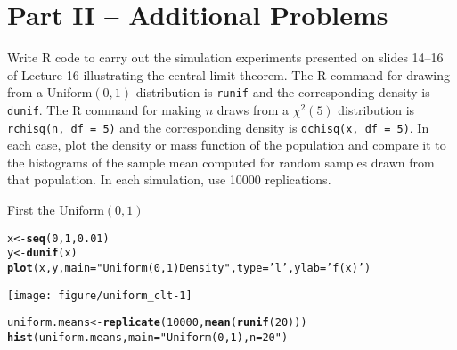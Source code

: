 \documentclass[addpoints,12pt]{exam}\usepackage[]{graphicx}\usepackage[]{color}
\makeatletter
\def\maxwidth{ %
  \ifdim\Gin@nat@width>\linewidth
    \linewidth
  \else
    \Gin@nat@width
  \fi
}
\newcommand{\hlnum}[1]{\textcolor[rgb]{0.686,0.059,0.569}{#1}}%
\newcommand{\hlstr}[1]{\textcolor[rgb]{0.192,0.494,0.8}{#1}}%
\newcommand{\hlstd}[1]{\textcolor[rgb]{0.345,0.345,0.345}{#1}}%
\newcommand{\hlkwb}[1]{\textcolor[rgb]{0.69,0.353,0.396}{#1}}%
\newcommand{\hlkwc}[1]{\textcolor[rgb]{0.333,0.667,0.333}{#1}}%
\newcommand{\hlkwd}[1]{\textcolor[rgb]{0.737,0.353,0.396}{\textbf{#1}}}%
\newenvironment{kframe}{%
 \def\at@end@of@kframe{}%
 \ifinner\ifhmode%
  \def\at@end@of@kframe{\end{minipage}}%
  \begin{minipage}{\columnwidth}%
 \fi\fi%
 \def\FrameCommand##1{\hskip\@totalleftmargin \hskip-\fboxsep
 \colorbox{shadecolor}{##1}\hskip-\fboxsep
     \hskip-\linewidth \hskip-\@totalleftmargin \hskip\columnwidth}%
 \MakeFramed {\advance\hsize-\width
   \@totalleftmargin\z@ \linewidth\hsize
   \@setminipage}}%
 {\par\unskip\endMakeFramed%
 \at@end@of@kframe}
\newenvironment{knitrout}{}{} %
\makeatother
\begin{document}
\begin{questions}
\begin{solution}
		\end{solution}
\end{questions}



 \section*{Part II -- Additional Problems}

\begin{questions}

\question Write R code to carry out the simulation experiments presented on slides 14--16 of Lecture 16 illustrating the central limit theorem. The R command for drawing from a Uniform$(0,1)$ distribution is \texttt{runif} and the corresponding density is \texttt{dunif}. 
The R command for making $n$ draws from a $\chi^2(5)$ distribution is \texttt{rchisq(n, df = 5)} and the corresponding density is \texttt{dchisq(x, df = 5)}.
In each case, plot the density or mass function of the population and compare it to the histograms of the sample mean computed for random samples drawn from that population. In each simulation, use 10000 replications.
	\begin{solution}
		First the Uniform$(0,1)$
\begin{knitrout}
\color{fgcolor}\begin{kframe}
\begin{alltt}
\hlstd{x} \hlkwb{<-} \hlkwd{seq}\hlstd{(}\hlnum{0}\hlstd{,} \hlnum{1}\hlstd{,} \hlnum{0.01}\hlstd{)}
\hlstd{y} \hlkwb{<-} \hlkwd{dunif}\hlstd{(x)}
\hlkwd{plot}\hlstd{(x, y,} \hlkwc{main} \hlstd{=} \hlstr{"Uniform(0,1) Density"}\hlstd{,} \hlkwc{type} \hlstd{=} \hlstr{'l'}\hlstd{,} \hlkwc{ylab} \hlstd{=} \hlstr{'f(x)'}\hlstd{)}
\end{alltt}
\end{kframe}

{\centering \texttt{[image: figure/uniform\_clt-1]} 

}


\begin{kframe}\begin{alltt}
\hlstd{uniform.means} \hlkwb{<-} \hlkwd{replicate}\hlstd{(}\hlnum{10000}\hlstd{,} \hlkwd{mean}\hlstd{(}\hlkwd{runif}\hlstd{(}\hlnum{20}\hlstd{)))}
\hlkwd{hist}\hlstd{(uniform.means,} \hlkwc{main} \hlstd{=} \hlstr{"Uniform(0,1), n = 20"}\hlstd{)}
\end{alltt}
\end{kframe}


\end{knitrout}
\end{solution}
\end{questions}
\end{document}
